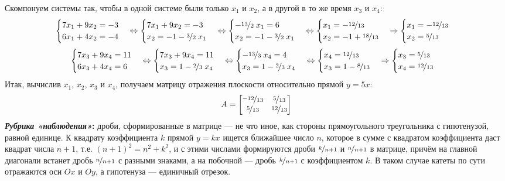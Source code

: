 \documentclass[a3paper,14pt]{extarticle}
\begin{document}
Скомпонуем системы так, чтобы в одной системе были только $x_1$ и $x_2$, а в другой в то же время $x_3$ и $x_4$:
$$\begin{cases}
        7x_1 + 9x_2 = -3 \\ 6x_1 + 4x_2 = -4
    \end{cases} \Leftrightarrow \begin{cases}
        7x_1 + 9x_2 = -3 \\ x_2 = -1 - \nicefrac{3}{2}\;x_1
    \end{cases} \Leftrightarrow \begin{cases}
        -\nicefrac{13}{2}\;x_1 = 6 \\ x_2 = -1 - \nicefrac{3}{2}\;x_1
    \end{cases} \Leftrightarrow \begin{cases}
        x_1 = -\nicefrac{12}{13} \\ x_2 = -1 + \nicefrac{18}{13}
    \end{cases} \Rightarrow \begin{cases}
        x_1 = -\nicefrac{12}{13} \\ x_2 = \nicefrac{5}{13}
    \end{cases}$$
$$\begin{cases}
        7x_3 + 9x_4 = 11 \\ 6x_3 + 4x_4 = 6
    \end{cases} \Leftrightarrow \begin{cases}
        7x_3 + 9x_4 = 11 \\ x_3 = 1 - \nicefrac{2}{3}\;x_4
    \end{cases} \Leftrightarrow \begin{cases}
        -\nicefrac{13}{3}\;x_4 = 4 \\ x_3 = 1 - \nicefrac{2}{3}\;x_4
    \end{cases} \Leftrightarrow \begin{cases}
        x_4 = \nicefrac{12}{13} \\ x_3 = 1 - \nicefrac{8}{13}
    \end{cases} \Rightarrow \begin{cases}
        x_3 = \nicefrac{5}{13} \\ x_4 = \nicefrac{12}{13}
    \end{cases}$$
Итак, вычислив $x_1$, $x_2$, $x_3$ и $x_4$, получаем матрицу отражения плоскости относительно прямой $y=5x$:
$$A = \begin{bmatrix}
    \nicefrac{-12}{13} & \nicefrac{5}{13} \\ \nicefrac{5}{13} & \nicefrac{12}{13}
\end{bmatrix}$$
\textbf{\textit{Рубрика «наблюдения»}:} дроби, сформированные в матрице --- не что иное, как стороны прямоугольного треугольника с гипотенузой, равной единице. К квадрату коэффициента $k$ прямой $y = kx$ ищется ближайшее число $n$, которое в сумме с квадратом коэффициента даст квадрат числа $n+1$, т.е. $(n+1)^2=n^2+k^2$, и с этими числами формируются дроби $\nicefrac{k}{n+1}$ и $\nicefrac{n}{n+1}$ в матрице, причём на главной диагонали встанет дробь $\nicefrac{n}{n+1}$ с разными знаками, а на побочной --- дробь $\nicefrac{k}{n+1}$ с коэффициентом $k$. В таком случае катеты по сути отражаются оси $Ox$ и $Oy$, а гипотенуза --- единичный отрезок.\pagebreak
\end{document}
